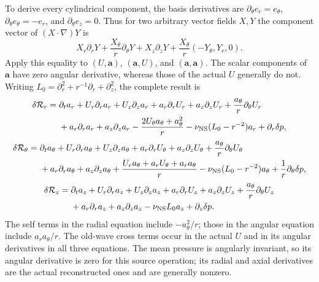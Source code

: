 \documentclass[11pt]{article}
\begin{document}
To derive every cylindrical component, the basis derivatives are
\(\partial_\theta e_r=e_\theta\),
\(\partial_\theta e_\theta=-e_r\), and
\(\partial_\theta e_z=0\). Thus for two arbitrary vector fields
\(X,Y\) the component vector of \((X\cdot\nabla)Y\) is
\[
 X_r\partial_rY+\frac{X_\theta}{r}\partial_\theta Y
 +X_z\partial_zY+\frac{X_\theta}{r}(-Y_\theta,Y_r,0).
\]
Apply this equality to \((U,\boldsymbol a)\),
\((\boldsymbol a,U)\), and \((\boldsymbol a,\boldsymbol a)\).
The scalar components of \(\boldsymbol a\) have zero angular
derivative, whereas those of the actual \(U\) generally do not.
Writing \(L_0=\partial_r^2+r^{-1}\partial_r+\partial_z^2\), the
complete result is
\begin{equation}\label{mcmean:force_r}
\begin{split}
 \delta\mathcal R_r={}&\partial_ta_r+U_r\partial_ra_r+U_z\partial_za_r
       +a_r\partial_rU_r+a_z\partial_zU_r
       +\frac{a_\theta}{r}\partial_\theta U_r\\
 &+a_r\partial_ra_r+a_z\partial_za_r
       -\frac{2U_\theta a_\theta+a_\theta^2}{r}
       -\nu_{\rm NS}(L_0-r^{-2})a_r+\partial_r\delta p,
\end{split}
\end{equation}
\begin{equation}\label{mcmean:force_theta}
\begin{split}
 \delta\mathcal R_\theta={}&\partial_ta_\theta
       +U_r\partial_ra_\theta+U_z\partial_za_\theta
       +a_r\partial_rU_\theta+a_z\partial_zU_\theta
       +\frac{a_\theta}{r}\partial_\theta U_\theta\\
 &+a_r\partial_ra_\theta+a_z\partial_za_\theta
       +\frac{U_ra_\theta+a_rU_\theta+a_ra_\theta}{r}
       -\nu_{\rm NS}(L_0-r^{-2})a_\theta
       +\frac1r\partial_\theta\delta p,
\end{split}
\end{equation}
\begin{equation}\label{mcmean:force_z}
\begin{split}
 \delta\mathcal R_z={}&\partial_ta_z+U_r\partial_ra_z+U_z\partial_za_z
       +a_r\partial_rU_z+a_z\partial_zU_z
       +\frac{a_\theta}{r}\partial_\theta U_z\\
 &+a_r\partial_ra_z+a_z\partial_za_z
       -\nu_{\rm NS}L_0a_z+\partial_z\delta p.
\end{split}
\end{equation}
The self terms in the radial equation include
\(-a_\theta^2/r\); those in the angular equation include
\(a_ra_\theta/r\). The old-wave cross terms occur in the actual
\(U\) and in its angular derivatives in all three equations.
The mean pressure is angularly invariant, so its angular derivative
is zero for this source operation; its radial and axial derivatives
are the actual reconstructed ones and are generally nonzero.
\end{document}
